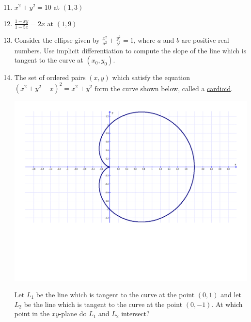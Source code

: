 \documentclass[12pt]{article}
\newif\ifans
\begin{document}
\begin{enumerate}
\setcounter{enumi}{10}

\item $x^2+y^2 = 10$ at $(1,3)$ 

\ifans{\fbox{$y=\frac{-x}{3}+\frac{10}{3}$}} \fi

\item $\frac{1-xy}{1-5x}=2x$ at $(1,9)$ 

\ifans{\fbox{$y=9x$}} \fi

\item Consider the ellipse given by $\frac{x^2}{a^2}+\frac{y^2}{b^2}=1$, where $a$ and $b$ are positive real numbers.  Use implicit differentiation to compute the slope of the line which is tangent to the curve at $(x_0,y_0)$.

\ifans{\fbox{$\left.\frac{dy}{dx}\right|_{(x,y)=(x_0,y_0)}=-\frac{b^2x_0}{a^2y_0}$}} \fi

\item The set of ordered pairs $(x,y)$ which satisfy the equation $(x^2+y^2-x)^2=x^2+y^2$ form the curve shown below, called a \underline{cardioid}.

\begin{center}
\includegraphics[scale=0.4]{cardioid.pdf}
\end{center}

Let $L_1$ be the line which is tangent to the curve at the point $(0,1)$ and let $L_2$ be the line which is tangent to the curve at the point $(0,-1)$.  At which point in the $xy$-plane do $L_1$ and $L_2$ intersect?

\ifans{\fbox{$(-1,0)$}} \fi


\end{enumerate}
\end{document}
